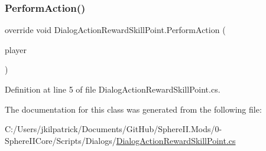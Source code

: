 \subsubsection{\texorpdfstring{PerformAction()}{PerformAction()}}
{\footnotesize\ttfamily override void Dialog\+Action\+Reward\+Skill\+Point.\+Perform\+Action (\begin{DoxyParamCaption}\item[{Entity\+Player}]{player }\end{DoxyParamCaption})}



Definition at line 5 of file Dialog\+Action\+Reward\+Skill\+Point.\+cs.



The documentation for this class was generated from the following file\+:\begin{DoxyCompactItemize}
\item 
C\+:/\+Users/jkilpatrick/\+Documents/\+Git\+Hub/\+Sphere\+I\+I.\+Mods/0-\/\+Sphere\+I\+I\+Core/\+Scripts/\+Dialogs/\mbox{\hyperlink{_dialog_action_reward_skill_point_8cs}{Dialog\+Action\+Reward\+Skill\+Point.\+cs}}\end{DoxyCompactItemize}

